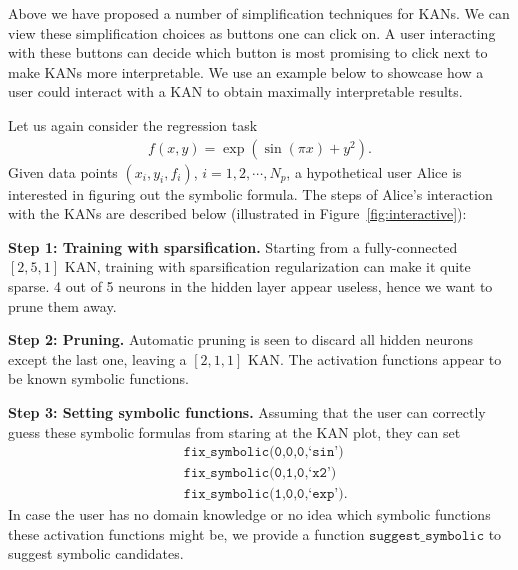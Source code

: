 \documentclass{article}
\numberwithin{equation}{section}
\numberwithin{figure}{section}
\begin{document}
Above we have proposed a number of simplification techniques for KANs. We can view these simplification choices as buttons one can click on. A user interacting with these buttons can decide which button is most promising to click next to make KANs more interpretable. %
We use an example below to showcase how a user could interact with a KAN to obtain maximally interpretable results. 

Let us again consider the regression task 
\begin{align}
    f(x,y) = \exp\left({\sin}(\pi x)+y^2\right).
\end{align}
Given data points $(x_i,y_i,f_i)$, $i=1,2,\cdots,N_p$, a hypothetical user Alice is interested in figuring out the symbolic formula. The steps of Alice's interaction with the KANs are described below (illustrated in Figure~\ref{fig:interactive}): 

{\bf Step 1: Training with sparsification.} Starting from a fully-connected $[2,5,1]$ KAN, training with sparsification regularization can make it quite sparse. 4 out of 5 neurons in the hidden layer appear useless, hence we want to prune them away.

{\bf Step 2: Pruning.} Automatic pruning is seen to discard all hidden neurons except the last one, leaving a $[2,1,1]$ KAN. The activation functions appear to be known symbolic functions.

{\bf Step 3: Setting symbolic functions.} Assuming that the user can correctly guess these symbolic formulas from staring at the KAN plot, they can set
\begin{equation}
\begin{aligned}
    &\texttt{fix\_symbolic(0,0,0,`sin')} \\ 
    &\texttt{fix\_symbolic(0,1,0,`x\^{}2')} \\
    &\texttt{fix\_symbolic(1,0,0,`exp')}.
\end{aligned}
\end{equation}
In case the user has no domain knowledge or no idea which symbolic functions these activation functions might be, we provide a function $\texttt{suggest\_symbolic}$ to suggest symbolic candidates.
\end{document}
